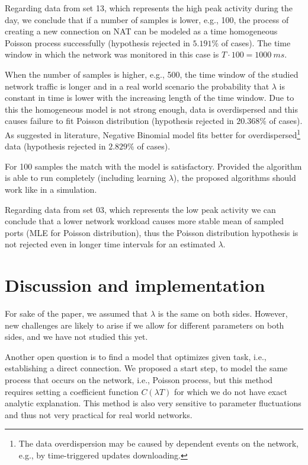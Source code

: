 \documentclass{acm_proc_article-sp}
\begin{document}
Regarding data from set 13, which represents the high peak activity during the day, we conclude that if a number of samples 
is lower, e.g., 100, the process of creating a new connection on NAT can 
be modeled as a time homogeneous Poisson process successfully (hypothesis rejected in $5.191\%$ of cases).
The time window in which the network was monitored in this case is $T \cdot 100 = 1000~ms$. 

When the number of samples is higher, e.g., 500, the time window of the studied network traffic is longer and
in a real world scenario the probability that $\lambda$ is constant in time is lower with the increasing length of the time
window. Due to this the homogeneous model is not strong enough, data is 
overdispersed and this causes failure to fit Poisson distribution (hypothesis rejected in $20.368\%$ of cases). As suggested
in literature, Negative Binomial model fits better for overdispersed\footnote{The data overdispersion may be caused by dependent events on the network, e.g., by time-triggered updates downloading.}
data (hypothesis rejected in $2.829\%$ of cases). 

For 100 samples the match with the model is satisfactory. Provided the algorithm is able to run completely (including learning $\lambda$), the proposed algorithms should work like in a simulation.

Regarding data from set 03, which represents the low peak activity we can conclude that a lower network workload causes more stable mean of sampled ports (MLE for Poisson distribution), thus the Poisson distribution hypothesis is not rejected even in longer time intervals for an estimated $\lambda$. 


\section{Discussion and implementation}
For sake of the paper, we assumed that $\lambda$ is the same on both sides. However, new challenges 
are likely to arise if we allow for different parameters on both sides, and we have not studied this yet.

Another open question is to find a model that optimizes given task, i.e., establishing a direct
connection. We proposed a start step, to model the same process that occurs on the network, i.e.,
Poisson process, but this method requires setting a coefficient function $C(\lambda T)$ for which 
we do not have exact analytic explanation. This method is also very sensitive to parameter fluctuations
and thus not very practical for real world networks. 
\end{document}
